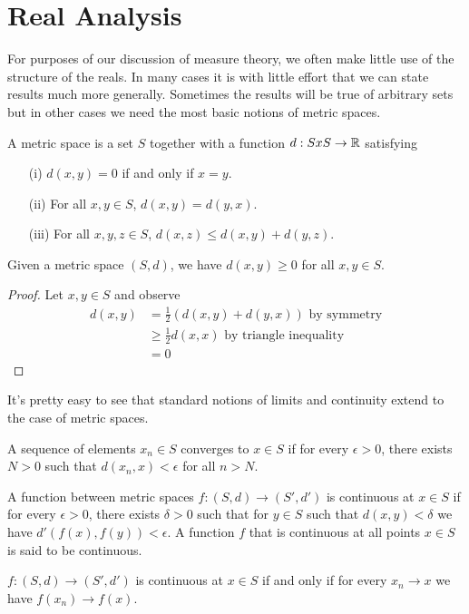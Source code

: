 \chapter{Real Analysis}
For purposes of our discussion of measure theory, we often make little
use of the structure of the reals.  In many cases it is with little
effort that we can state results much more generally.  Sometimes the
results will be true of arbitrary sets but in other cases we need the
most basic notions of metric spaces.
\begin{defn}A metric space is a set $S$ together with a function
  $d:SxS \to \mathbb{R}$ satisfying
\begin{itemize}
\item[(i)]$d(x,y) = 0$ if and only if $x=y$.
\item[(ii)]For all $x,y \in S$, $d(x,y) = d(y,x)$.
\item[(iii)]For all $x,y,z \in S$, $d(x,z) \leq d(x,y) + d(y,z)$.
\end{itemize}
\end{defn}
\begin{lem} Given a metric space $(S,d)$, we have $d(x,y) \geq 0$ for all
  $x,y \in S$.
\end{lem}
\begin{proof}
Let $x,y \in S$ and observe 
\begin{align*}
d(x,y) &= \frac{1}{2} (d(x,y) + d(y,x)) \textrm { by symmetry} \\
&\geq \frac{1}{2} d(x,x) \textrm{ by triangle inequality} \\
&= 0
\end{align*}
\end{proof}
 It's pretty easy to see that standard notions of limits and continuity
extend to the case of metric spaces.
\begin{defn}A sequence of elements $x_n \in S$ converges to $x \in S$
  if for every $\epsilon > 0$, there exists $N > 0$ such that
  $d(x_n,x) < \epsilon$ for all $n > N$.
\end{defn}
\begin{defn}A function between metric spaces $f : (S,d) \to (S', d')$
  is continuous at $x \in S$ if for every $\epsilon>0$, there exists
  $\delta > 0$ such that for $y\in S$ such that $d(x,y)<\delta$ we
  have $d'(f(x),f(y)) < \epsilon$.  A function $f$ that is continuous
  at all points $x \in S$ is said to be continuous.
\end{defn}
\begin{lem}$f : (S,d) \to (S', d')$ is continuous at $x \in S$ if and only if for
  every $x_n \to x$ we have $f(x_n) \to f(x)$.
\end{lem}
